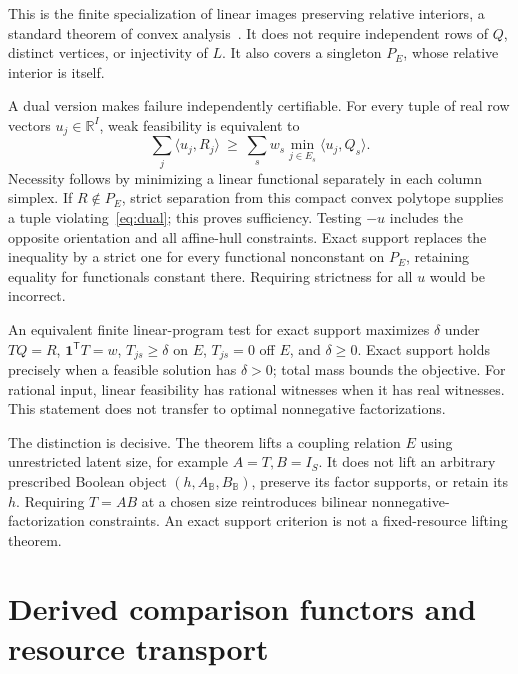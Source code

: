 \documentclass[11pt]{article}
\newcommand{\B}{\mathbb B}
\newcommand{\R}{\mathbb R}
\newcommand{\one}{\mathbf 1}
\theoremstyle{remark}
\begin{document}
This is the finite specialization of linear images preserving relative interiors, a standard theorem of convex analysis~\cite{Rockafellar1970}. It does not require independent rows of $Q$, distinct vertices, or injectivity of $L$. It also covers a singleton $P_E$, whose relative interior is itself.

A dual version makes failure independently certifiable. For every tuple of real row vectors $u_j\in\R^I$, weak feasibility is equivalent to
\begin{equation}\label{eq:dual}
 \sum_j\langle u_j,R_j\rangle
 \ \ge\ \sum_sw_s\min_{j\in E_s}\langle u_j,Q_s\rangle.
\end{equation}
Necessity follows by minimizing a linear functional separately in each column simplex. If $R\notin P_E$, strict separation from this compact convex polytope supplies a tuple violating~\eqref{eq:dual}; this proves sufficiency. Testing $-u$ includes the opposite orientation and all affine-hull constraints. Exact support replaces the inequality by a strict one for every functional nonconstant on $P_E$, retaining equality for functionals constant there. Requiring strictness for all $u$ would be incorrect.

An equivalent finite linear-program test for exact support maximizes $\delta$ under $TQ=R$, $\one^{\mathsf T}T=w$, $T_{js}\ge\delta$ on $E$, $T_{js}=0$ off $E$, and $\delta\ge0$. Exact support holds precisely when a feasible solution has $\delta>0$; total mass bounds the objective. For rational input, linear feasibility has rational witnesses when it has real witnesses. This statement does not transfer to optimal nonnegative factorizations.

The distinction is decisive. The theorem lifts a coupling relation $E$ using unrestricted latent size, for example $A=T,B=I_S$. It does not lift an arbitrary prescribed Boolean object $(h,A_{\B},B_{\B})$, preserve its factor supports, or retain its $h$. Requiring $T=AB$ at a chosen size reintroduces bilinear nonnegative-factorization constraints. An exact support criterion is not a fixed-resource lifting theorem.

\section{Derived comparison functors and resource transport}\label{sec:transport}
\end{document}
